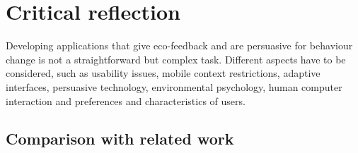 \chapter{Critical reflection}

Developing applications that give eco-feedback and are persuasive for behaviour change is not a straightforward but complex task. Different aspects have to be considered, such as usability issues, mobile context restrictions, adaptive interfaces, persuasive technology, environmental psychology, human computer interaction and preferences and characteristics of users.

\section{Comparison with related work}